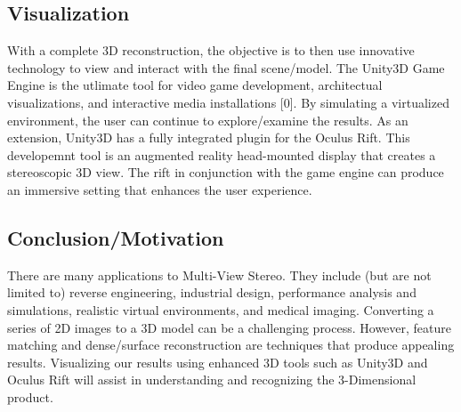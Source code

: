 \documentclass[10pt,twocolumn,letterpaper]{article}
\begin{document}
\subsection{Visualization}
With a complete 3D reconstruction, the objective is to then use innovative technology to view and interact with the final scene/model. The Unity3D Game Engine is the utlimate tool for video game development, architectual visualizations, and interactive media installations [0].  By simulating a virtualized environment, the user can continue to explore/examine the results.  As an extension, Unity3D has a fully integrated plugin for the Oculus Rift.  This developemnt tool is an augmented reality head-mounted display that creates a stereoscopic 3D view.  The rift in conjunction with the game engine can produce an immersive setting that enhances the user experience.

\subsection{Conclusion/Motivation}
There are many applications to Multi-View Stereo.  They include (but are not limited to) reverse engineering, industrial design, performance analysis and simulations, realistic virtual environments, and medical imaging.  Converting a series of 2D images to a 3D model can be a challenging process.  However, feature matching and dense/surface reconstruction are techniques that produce appealing results.  Visualizing our results using enhanced 3D tools such as Unity3D and Oculus Rift will assist in understanding and recognizing the 3-Dimensional product.





\end{document}
